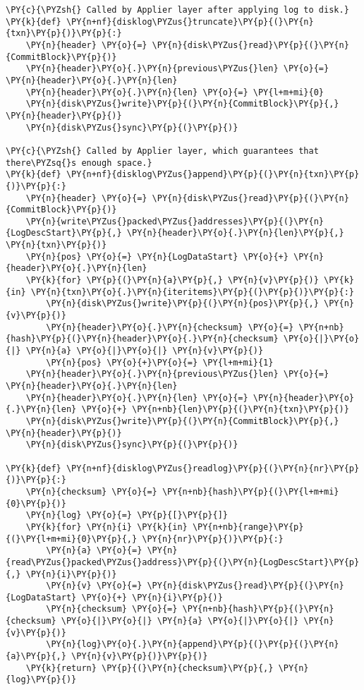 \begin{BVerbatim}[commandchars=\\\{\}]
\PY{c}{\PYZsh{} Called by Applier layer after applying log to disk.}
\PY{k}{def} \PY{n+nf}{disklog\PYZus{}truncate}\PY{p}{(}\PY{n}{txn}\PY{p}{)}\PY{p}{:}
    \PY{n}{header} \PY{o}{=} \PY{n}{disk\PYZus{}read}\PY{p}{(}\PY{n}{CommitBlock}\PY{p}{)}
    \PY{n}{header}\PY{o}{.}\PY{n}{previous\PYZus{}len} \PY{o}{=} \PY{n}{header}\PY{o}{.}\PY{n}{len}
    \PY{n}{header}\PY{o}{.}\PY{n}{len} \PY{o}{=} \PY{l+m+mi}{0}
    \PY{n}{disk\PYZus{}write}\PY{p}{(}\PY{n}{CommitBlock}\PY{p}{,} \PY{n}{header}\PY{p}{)}
    \PY{n}{disk\PYZus{}sync}\PY{p}{(}\PY{p}{)}

\PY{c}{\PYZsh{} Called by Applier layer, which guarantees that there\PYZsq{}s enough space.}
\PY{k}{def} \PY{n+nf}{disklog\PYZus{}append}\PY{p}{(}\PY{n}{txn}\PY{p}{)}\PY{p}{:}
    \PY{n}{header} \PY{o}{=} \PY{n}{disk\PYZus{}read}\PY{p}{(}\PY{n}{CommitBlock}\PY{p}{)}
    \PY{n}{write\PYZus{}packed\PYZus{}addresses}\PY{p}{(}\PY{n}{LogDescStart}\PY{p}{,} \PY{n}{header}\PY{o}{.}\PY{n}{len}\PY{p}{,} \PY{n}{txn}\PY{p}{)}
    \PY{n}{pos} \PY{o}{=} \PY{n}{LogDataStart} \PY{o}{+} \PY{n}{header}\PY{o}{.}\PY{n}{len}
    \PY{k}{for} \PY{p}{(}\PY{n}{a}\PY{p}{,} \PY{n}{v}\PY{p}{)} \PY{k}{in} \PY{n}{txn}\PY{o}{.}\PY{n}{iteritems}\PY{p}{(}\PY{p}{)}\PY{p}{:}
        \PY{n}{disk\PYZus{}write}\PY{p}{(}\PY{n}{pos}\PY{p}{,} \PY{n}{v}\PY{p}{)}
        \PY{n}{header}\PY{o}{.}\PY{n}{checksum} \PY{o}{=} \PY{n+nb}{hash}\PY{p}{(}\PY{n}{header}\PY{o}{.}\PY{n}{checksum} \PY{o}{|}\PY{o}{|} \PY{n}{a} \PY{o}{|}\PY{o}{|} \PY{n}{v}\PY{p}{)}
        \PY{n}{pos} \PY{o}{+}\PY{o}{=} \PY{l+m+mi}{1}
    \PY{n}{header}\PY{o}{.}\PY{n}{previous\PYZus{}len} \PY{o}{=} \PY{n}{header}\PY{o}{.}\PY{n}{len}
    \PY{n}{header}\PY{o}{.}\PY{n}{len} \PY{o}{=} \PY{n}{header}\PY{o}{.}\PY{n}{len} \PY{o}{+} \PY{n+nb}{len}\PY{p}{(}\PY{n}{txn}\PY{p}{)}
    \PY{n}{disk\PYZus{}write}\PY{p}{(}\PY{n}{CommitBlock}\PY{p}{,} \PY{n}{header}\PY{p}{)}
    \PY{n}{disk\PYZus{}sync}\PY{p}{(}\PY{p}{)}

\PY{k}{def} \PY{n+nf}{disklog\PYZus{}readlog}\PY{p}{(}\PY{n}{nr}\PY{p}{)}\PY{p}{:}
    \PY{n}{checksum} \PY{o}{=} \PY{n+nb}{hash}\PY{p}{(}\PY{l+m+mi}{0}\PY{p}{)}
    \PY{n}{log} \PY{o}{=} \PY{p}{[}\PY{p}{]}
    \PY{k}{for} \PY{n}{i} \PY{k}{in} \PY{n+nb}{range}\PY{p}{(}\PY{l+m+mi}{0}\PY{p}{,} \PY{n}{nr}\PY{p}{)}\PY{p}{:}
        \PY{n}{a} \PY{o}{=} \PY{n}{read\PYZus{}packed\PYZus{}address}\PY{p}{(}\PY{n}{LogDescStart}\PY{p}{,} \PY{n}{i}\PY{p}{)}
        \PY{n}{v} \PY{o}{=} \PY{n}{disk\PYZus{}read}\PY{p}{(}\PY{n}{LogDataStart} \PY{o}{+} \PY{n}{i}\PY{p}{)}
        \PY{n}{checksum} \PY{o}{=} \PY{n+nb}{hash}\PY{p}{(}\PY{n}{checksum} \PY{o}{|}\PY{o}{|} \PY{n}{a} \PY{o}{|}\PY{o}{|} \PY{n}{v}\PY{p}{)}
        \PY{n}{log}\PY{o}{.}\PY{n}{append}\PY{p}{(}\PY{p}{(}\PY{n}{a}\PY{p}{,} \PY{n}{v}\PY{p}{)}\PY{p}{)}
    \PY{k}{return} \PY{p}{(}\PY{n}{checksum}\PY{p}{,} \PY{n}{log}\PY{p}{)}


\end{BVerbatim}
